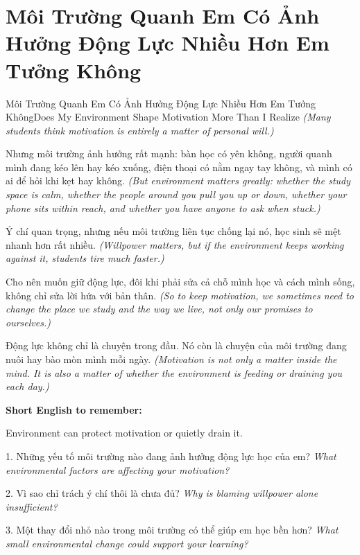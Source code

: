 \section{Môi Trường Quanh Em Có Ảnh Hưởng Động Lực Nhiều Hơn Em Tưởng Không}
\begin{truyen}{Môi Trường Quanh Em Có Ảnh Hưởng Động Lực Nhiều Hơn Em Tưởng Không}{Does My Environment Shape Motivation More Than I Realize}
\textit{(Many students think motivation is entirely a matter of personal will.)}

Nhưng môi trường ảnh hưởng rất mạnh: bàn học có yên không, người quanh mình đang kéo lên hay kéo xuống, điện thoại có nằm ngay tay không, và mình có ai để hỏi khi kẹt hay không.
\textit{(But environment matters greatly: whether the study space is calm, whether the people around you pull you up or down, whether your phone sits within reach, and whether you have anyone to ask when stuck.)}

Ý chí quan trọng, nhưng nếu môi trường liên tục chống lại nó, học sinh sẽ mệt nhanh hơn rất nhiều.
\textit{(Willpower matters, but if the environment keeps working against it, students tire much faster.)}

Cho nên muốn giữ động lực, đôi khi phải sửa cả chỗ mình học và cách mình sống, không chỉ sửa lời hứa với bản thân.
\textit{(So to keep motivation, we sometimes need to change the place we study and the way we live, not only our promises to ourselves.)}
\end{truyen}

\begin{baihoc}
Động lực không chỉ là chuyện trong đầu. Nó còn là chuyện của môi trường đang nuôi hay bào mòn mình mỗi ngày.
\textit{(Motivation is not only a matter inside the mind. It is also a matter of whether the environment is feeding or draining you each day.)}
\end{baihoc}

\begin{ghinhoanh}
\textbf{Short English to remember:}

Environment can protect motivation or quietly drain it.

\end{ghinhoanh}

\begin{tuhocnhanh}
1. Những yếu tố môi trường nào đang ảnh hưởng động lực học của em? \textit{What environmental factors are affecting your motivation?}

2. Vì sao chỉ trách ý chí thôi là chưa đủ? \textit{Why is blaming willpower alone insufficient?}

3. Một thay đổi nhỏ nào trong môi trường có thể giúp em học bền hơn? \textit{What small environmental change could support your learning?}
\end{tuhocnhanh}
\ngancach
